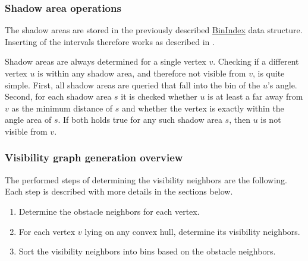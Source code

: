 		\subsubsection{Shadow area operations}
			
			The shadow areas are stored in the previously described \hyperref[subsec:binindex]{BinIndex} data structure.
			Inserting of the intervals therefore works as described in .
			
			Shadow areas are always determined for a single vertex $v$.
			Checking if a different vertex $u$ is within any shadow area, and therefore not visible from $v$, is quite simple.
			First, all shadow areas are queried that fall into the bin of the $u$'s angle.
			Second, for each shadow area $s$ it is checked whether $u$ is at least a far away from $v$ as the minimum distance of $s$ and whether the vertex is exactly within the angle area of $s$.
			If both holds true for any such shadow area $s$, then $u$ is not visible from $v$.
		
		\subsubsection{Visibility graph generation overview}
		
			The performed steps of determining the visibility neighbors are the following.
			Each step is described with more details in the sections below.
			\begin{enumerate}[leftmargin=2.25em+\widthof{2.},label={2.\arabic*.}]
				\item Determine the obstacle neighbors for each vertex.
				\item For each vertex $v$ lying on any convex hull, determine its visibility neighbors.
				\item Sort the visibility neighbors into bins based on the obstacle neighbors.
			\end{enumerate}
		
